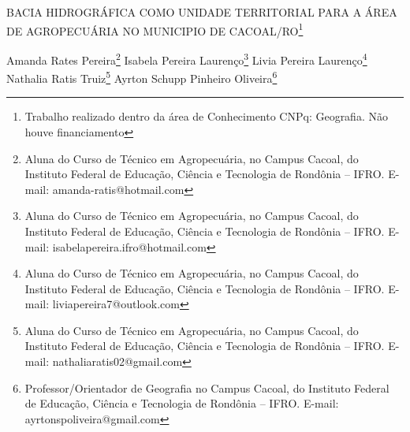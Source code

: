 \documentclass[article,12pt,onesidea,4paper,english,brazil]{abntex2}
\begin{document}
	
	
	\frenchspacing 
	
	\begin{center}
		\LARGE BACIA HIDROGRÁFICA COMO UNIDADE TERRITORIAL PARA A ÁREA DE AGROPECUÁRIA NO MUNICIPIO DE CACOAL/RO\footnote{Trabalho realizado dentro da área de Conhecimento CNPq: Geografia. Não houve financiamento}
		
		\normalsize
	Amanda Rates Pereira\footnote{Aluna do Curso de Técnico em Agropecuária, no Campus Cacoal, do Instituto Federal de Educação, Ciência e Tecnologia de Rondônia – IFRO. E-mail: amanda-ratis@hotmail.com} 
		Isabela Pereira Laurenço\footnote{Aluna do Curso de Técnico em Agropecuária, no Campus Cacoal, do Instituto Federal de Educação, Ciência e Tecnologia de Rondônia – IFRO. E-mail: isabelapereira.ifro@hotmail.com} 
	Livia Pereira Laurenço\footnote{Aluna do Curso de Técnico em Agropecuária, no Campus Cacoal, do Instituto Federal de Educação, Ciência e Tecnologia de Rondônia – IFRO. E-mail: liviapereira7@outlook.com} 
	Nathalia Ratis Truiz\footnote{Aluna do Curso de Técnico em Agropecuária, no Campus Cacoal, do Instituto Federal de Educação, Ciência e Tecnologia de Rondônia – IFRO. E-mail: nathaliaratis02@gmail.com}
	Ayrton Schupp Pinheiro Oliveira\footnote{Professor/Orientador de Geografia no Campus Cacoal, do Instituto Federal de Educação, Ciência e Tecnologia de Rondônia – IFRO. E-mail: ayrtonspoliveira@gmail.com} 
	\end{center}
	
\end{document}
